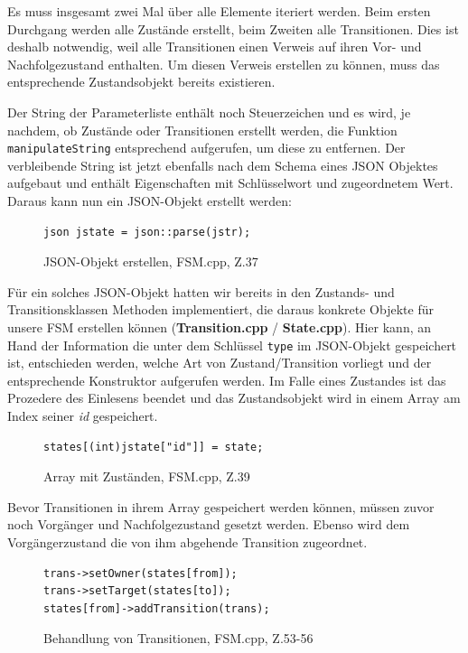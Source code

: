 Es muss insgesamt zwei Mal über alle Elemente iteriert werden. Beim ersten
Durchgang werden alle Zustände erstellt, beim Zweiten alle Transitionen. Dies
ist deshalb notwendig, weil alle Transitionen einen Verweis auf ihren Vor- und
Nachfolgezustand enthalten. Um diesen Verweis erstellen zu können, muss das
entsprechende Zustandsobjekt bereits existieren.

Der String der Parameterliste enthält noch Steuerzeichen und es wird, je
nachdem, ob Zustände oder Transitionen erstellt werden, die Funktion
\texttt{manipulateString} entsprechend aufgerufen, um diese zu entfernen. Der
verbleibende String ist jetzt ebenfalls nach dem Schema eines JSON Objektes
aufgebaut und enthält Eigenschaften mit Schlüsselwort und zugeordnetem Wert.
Daraus kann nun ein JSON-Objekt erstellt werden:

\begin{figure}[thp]
\begin{lstlisting}[style=json]
json jstate = json::parse(jstr);

\end{lstlisting}

\centering
\caption{JSON-Objekt erstellen, FSM.cpp, Z.37}
\end{figure}


Für ein solches JSON-Objekt hatten wir bereits in den Zustands- und
Transitionsklassen Methoden implementiert, die daraus konkrete Objekte für unsere
FSM erstellen können (\textbf{Transition.cpp} / \textbf{State.cpp}).
Hier kann, an Hand der Information die unter dem Schlüssel \texttt{type} im JSON-Objekt
gespeichert ist, entschieden werden, welche Art von Zustand/Transition vorliegt
und der entsprechende Konstruktor aufgerufen werden.
Im Falle eines Zustandes ist das Prozedere des Einlesens beendet und das
Zustandsobjekt wird in einem Array am Index seiner \textit{id} gespeichert.

\begin{figure}[thp]
\begin{lstlisting}
states[(int)jstate["id"]] = state;

\end{lstlisting}
\centering
\caption{Array mit Zuständen, FSM.cpp, Z.39}
\end{figure}



Bevor Transitionen in ihrem Array gespeichert werden können, müssen zuvor noch
Vorgänger und Nachfolgezustand gesetzt werden. Ebenso wird dem Vorgängerzustand
die von ihm abgehende Transition zugeordnet.

\begin{figure}[thp]
\begin{lstlisting}[style=json]
trans->setOwner(states[from]);
trans->setTarget(states[to]);
states[from]->addTransition(trans);

\end{lstlisting}
\centering
\caption{Behandlung von Transitionen, FSM.cpp, Z.53-56}
\end{figure}

